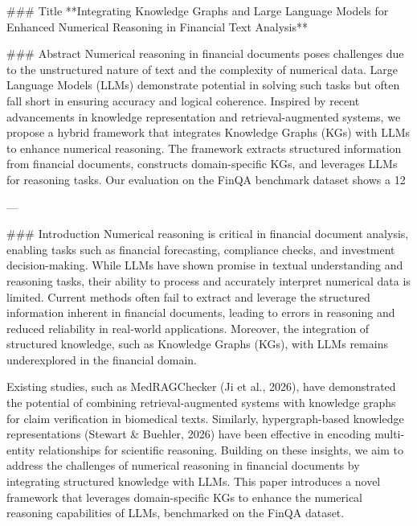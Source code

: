 ### Title  
**Integrating Knowledge Graphs and Large Language Models for Enhanced Numerical Reasoning in Financial Text Analysis**

### Abstract  
Numerical reasoning in financial documents poses challenges due to the unstructured nature of text and the complexity of numerical data. Large Language Models (LLMs) demonstrate potential in solving such tasks but often fall short in ensuring accuracy and logical coherence. Inspired by recent advancements in knowledge representation and retrieval-augmented systems, we propose a hybrid framework that integrates Knowledge Graphs (KGs) with LLMs to enhance numerical reasoning. The framework extracts structured information from financial documents, constructs domain-specific KGs, and leverages LLMs for reasoning tasks. Our evaluation on the FinQA benchmark dataset shows a 12%

---

### Introduction  
Numerical reasoning is critical in financial document analysis, enabling tasks such as financial forecasting, compliance checks, and investment decision-making. While LLMs have shown promise in textual understanding and reasoning tasks, their ability to process and accurately interpret numerical data is limited. Current methods often fail to extract and leverage the structured information inherent in financial documents, leading to errors in reasoning and reduced reliability in real-world applications. Moreover, the integration of structured knowledge, such as Knowledge Graphs (KGs), with LLMs remains underexplored in the financial domain.

Existing studies, such as MedRAGChecker (Ji et al., 2026), have demonstrated the potential of combining retrieval-augmented systems with knowledge graphs for claim verification in biomedical texts. Similarly, hypergraph-based knowledge representations (Stewart & Buehler, 2026) have been effective in encoding multi-entity relationships for scientific reasoning. Building on these insights, we aim to address the challenges of numerical reasoning in financial documents by integrating structured knowledge with LLMs. This paper introduces a novel framework that leverages domain-specific KGs to enhance the numerical reasoning capabilities of LLMs, benchmarked on the FinQA dataset.

